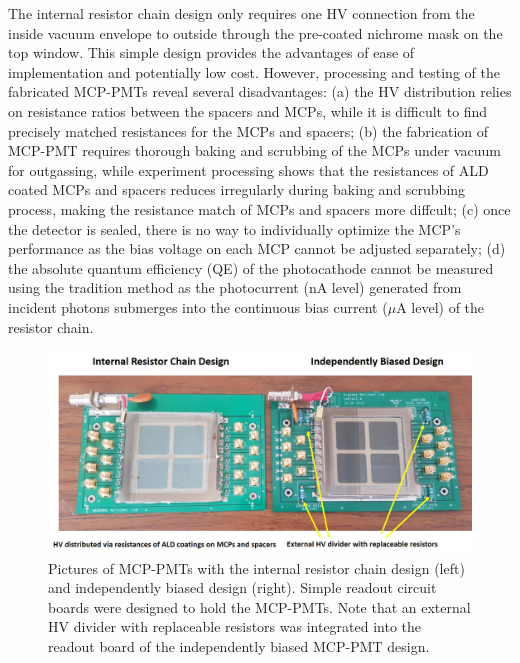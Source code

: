 \documentclass[preprint,5p]{elsarticle}
\begin{document}
The internal resistor chain design only requires one HV connection from the 
inside vacuum envelope to outside through the pre-coated nichrome mask on the 
top window. This simple design provides the advantages of ease of 
implementation and potentially low cost. However, processing and testing of the 
fabricated MCP-PMTs reveal several disadvantages: (a) the HV distribution 
relies on resistance ratios between the spacers and MCPs, while it is difficult 
to find precisely matched resistances for the MCPs and spacers; (b) the 
fabrication of MCP-PMT requires thorough baking and scrubbing of the MCPs under 
vacuum for outgassing, while experiment processing shows that the resistances 
of ALD coated MCPs and spacers reduces irregularly during baking and scrubbing 
process, making the resistance match of MCPs and spacers more diffcult; (c) 
once the detector is sealed, there is no way to individually optimize the MCP’s 
performance as the bias voltage on each MCP cannot be adjusted separately; (d) 
the absolute quantum efficiency (QE) of the photocathode cannot be measured 
using the tradition method as the photocurrent (nA level) generated from 
incident photons submerges into the continuous bias current ($\mu$A level) of 
the resistor chain.      

\begin{figure}[tbp]
\centering \includegraphics[scale=0.7]{fig/Figure2.jpg}
 \caption{Pictures of MCP-PMTs with the internal resistor chain design (left) 
   and independently biased design (right). Simple readout circuit boards were 
   designed to hold the MCP-PMTs. Note that an external HV divider with 
   replaceable resistors was integrated into the readout board of the 
   independently biased MCP-PMT design. } \label{fig:pics}
\end{figure}
\end{document}
